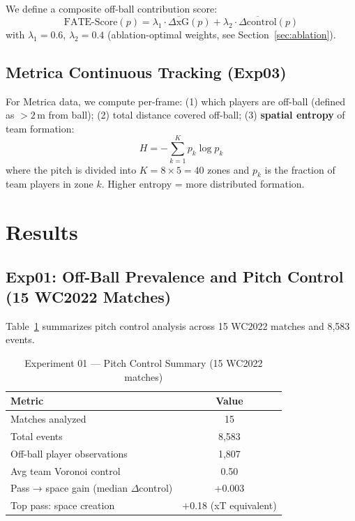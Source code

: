 \documentclass[10pt,twocolumn]{article}
\begin{document}
We define a composite off-ball contribution score:
\begin{equation}
  \text{FATE-Score}(p) = \lambda_1 \cdot \overline{\Delta\text{xG}}(p) + \lambda_2 \cdot \overline{\Delta\text{control}}(p)
\end{equation}
with $\lambda_1 = 0.6$, $\lambda_2 = 0.4$ (ablation-optimal weights, see Section~\ref{sec:ablation}).

\subsection{Metrica Continuous Tracking (Exp03)}

For Metrica data, we compute per-frame: (1) which players are off-ball (defined as $> 2$\,m from ball); (2) total distance covered off-ball; (3) \textbf{spatial entropy} of team formation:
\begin{equation}
  H = -\sum_{k=1}^{K} p_k \log p_k
\end{equation}
where the pitch is divided into $K = 8 \times 5 = 40$ zones and $p_k$ is the fraction of team players in zone $k$. Higher entropy = more distributed formation.

\section{Results}
\label{sec:results}

\subsection{Exp01: Off-Ball Prevalence and Pitch Control (15 WC2022 Matches)}

Table~\ref{tab:exp01} summarizes pitch control analysis across 15 WC2022 matches and 8,583 events.

\begin{table}[h]
  \centering
  \caption{Experiment 01 — Pitch Control Summary (15 WC2022 matches)}
  \label{tab:exp01}
  \begin{tabular}{lc}
    \toprule
    Metric & Value \\
    \midrule
    Matches analyzed & 15 \\
    Total events & 8,583 \\
    Off-ball player observations & 1,807 \\
    Avg team Voronoi control & 0.50 \\
    Pass → space gain (median $\Delta$control) & +0.003 \\
    Top pass: space creation & $+$0.18 (xT equivalent) \\
    \bottomrule
  \end{tabular}
\end{table}
\end{document}
